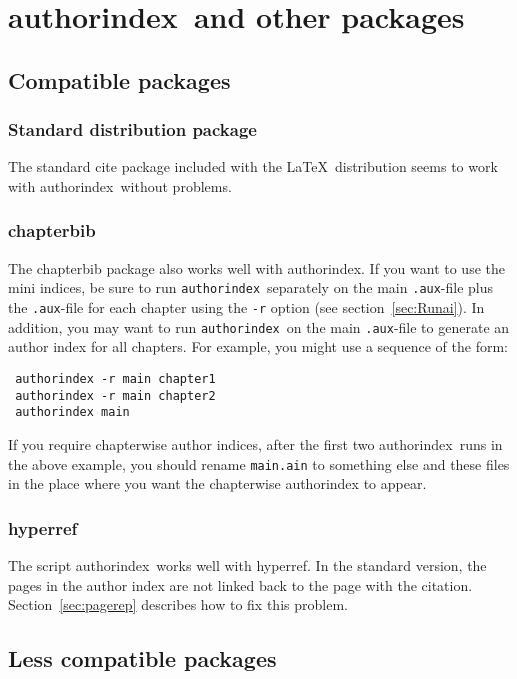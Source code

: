\documentclass[a4paper]{article}
\newcommand{\package}[1]{\textsf{#1}}
\newcommand{\authorindex}{\package{authorindex}}
\newcommand{\file}[1]{\texttt{#1}}
\newcommand{\fnext}[1]{\file{.#1}}
\newcommand{\cmdline}[1]{\texttt{#1}}
\newcommand{\option}[1]{\cmdline{#1}}
\newcommand{\aiperl}{\cmdline{authorindex}}
\newcommand{\ltxinp}[1]{\texttt{\string#1}}
\begin{document}
\section{\authorindex\ and other packages}

\subsection{Compatible packages}

\subsubsection{Standard distribution package}

The standard \package{cite} package included with the \LaTeX\ distribution
seems to work with \authorindex\ without problems.

\subsubsection{chapterbib}

The \package{chapterbib} package also works well with \authorindex.  If you
want to use the mini indices, be sure to run \aiperl\ separately on the main
\fnext{aux}-file plus the \fnext{aux}-file for each chapter using the
\option{-r} option (see section~\ref{sec:Runai}). In addition, you may want to
run \aiperl\ on the main \fnext{aux}-file to generate an author index for all
chapters. For example, you might use a sequence of the form:
\begin{verbatim}
 authorindex -r main chapter1
 authorindex -r main chapter2
 authorindex main
\end{verbatim}
If you require chapterwise author indices, after the first two \authorindex\ 
runs in the above example, you should rename \file{main.ain} to something else
and \ltxinp{} these files in the place where you want the chapterwise
authorindex to appear.

\subsubsection{hyperref}

The script \authorindex\ works well with \package{hyperref}.  In the standard
version, the pages in the author index are not linked back to the page with the
citation.  Section~\ref{sec:pagerep} describes how to fix this problem.

\subsection{Less compatible packages}
\end{document}
